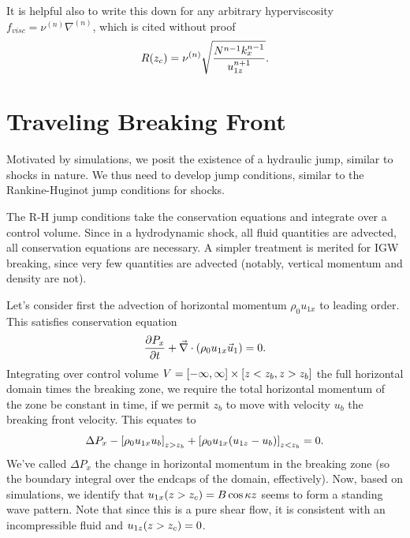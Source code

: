 \documentclass[11pt,
        usenames, %
        dvipsnames %
    ]{report}
\newcommand*{\pd}[2]{\frac{\partial#1}{\partial#2}}
\DeclarePairedDelimiter\p{\lparen}{\rparen}
\DeclarePairedDelimiter\s{\lbrack}{\rbrack}
\begin{document}
It is helpful also to write this down for any arbitrary hyperviscosity $f_{visc}
= \nu^{(n)} \nabla^{(n)}$, which is cited without proof
\begin{equation}
    R\p*{z_c} = \nu^{(n)} \sqrt{\frac{N^{n - 1}k_x^{n - 1}}{u_{1z}^{n + 1}}}.
\end{equation}

\section{Traveling Breaking Front}

Motivated by simulations, we posit the existence of a hydraulic jump, similar to
shocks in nature. We thus need to develop jump conditions, similar to the
Rankine-Huginot jump conditions for shocks.

The R-H jump conditions take the conservation equations and integrate over a
control volume. Since in a hydrodynamic shock, all fluid quantities are
advected, all conservation equations are necessary. A simpler treatment is
merited for IGW breaking, since very few quantities are advected (notably,
vertical momentum and density are not).

Let's consider first the advection of horizontal momentum $\rho_0 u_{1x}$ to
leading order. This satisfies conservation equation
\begin{equation}
    \pd{P_x}{t} + \vec{\nabla} \cdot \p*{\rho_0 u_{1x}\vec{u}_1} = 0.
\end{equation}
Integrating over control volume $V = \s*{-\infty, \infty} \times \s*{z < z_b, z
> z_b}$ the full horizontal domain times the breaking zone, we require the total
horizontal momentum of the zone be constant in time, if we permit $z_b$ to move
with velocity $u_b$ the breaking front velocity. This equates to
\begin{equation}
    \Delta P_x - \s*{\rho_0 u_{1x}u_b}_{z > z_b}
        + \s*{\rho_0 u_{1x}\p*{u_{1z} - u_b}}_{z < z_b} = 0.
\end{equation}
We've called $\Delta P_x$ the change in horizontal momentum in the breaking zone
(so the boundary integral over the endcaps of the domain, effectively). Now,
based on simulations, we identify that $u_{1x}\p*{z > z_c} = B\cos \kappa z$
seems to form a standing wave pattern. Note that since this is a pure shear
flow, it is consistent with an incompressible fluid and $u_{1z}\p*{z > z_c} =
0$.
\end{document}
